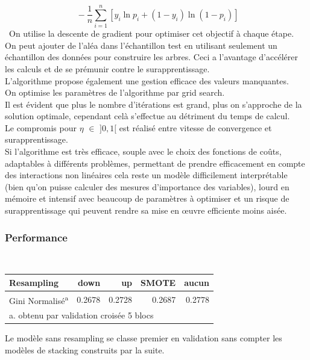 \documentclass[french]{article}
\begin{document}
\begin{multicols}{2}
 \[\ -\frac{1}{n} \sum_{i=1}^{n} \left[y_{i} \ln p_{i}+\left(1-y_{i}\right) \ln \left(1-p_{i}\right)\right] \]\
On utilise la descente de gradient pour optimiser cet objectif à chaque étape.\\
On peut ajouter de l'aléa dans l'échantillon test en utilisant seulement un échantillon des données pour construire les arbres. Ceci a l'avantage d'accélérer les calculs et de se prémunir contre le surapprentissage.\\
L'algorithme propose également une gestion efficace des valeurs manquantes.\\
On optimise les paramètres de l'algorithme par grid search.\\
Il est évident que plus le nombre d'itérations est grand, plus on s'approche de la solution optimale, cependant celà s'effectue au détriment du temps de calcul.\\
Le compromis pour $\eta$ $\in$ $]0,1[ $ est réalisé entre vitesse de convergence et surapprentissage.\\
Si l'algorithme est très efficace, souple avec le choix des fonctions de coûts,
adaptables à différents problèmes, permettant de prendre efficacement en compte des interactions non linéaires cela reste un modèle difficilement interprétable (bien qu'on puisse calculer des mesures d'importance des variables), lourd en mémoire et intensif avec beaucoup de paramètres à optimiser et un risque de surapprentissage qui peuvent rendre sa mise en œuvre efficiente moins aisée.


\subsubsection{Performance}

\

\begin{center}\begin{tabular}{l|rrrr}
  Resampling & down & up & SMOTE & aucun \\ \hline
  Gini Normalisé\textsuperscript{a} & 0.2678 & 0.2728 & 0.2687 & 0.2778 \\
  \multicolumn{4}{l}{\footnotesize a. obtenu par validation croisée 5 blocs}
\end{tabular}\end{center}

Le modèle sans resampling se classe premier en validation sans compter les modèles de stacking construits par la suite.






\end{multicols}
\end{document}

